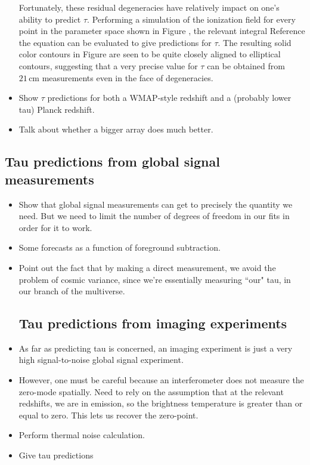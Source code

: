 \documentclass[twocolumn,aps,prd,nofootinbib,showpacs]{revtex4-1}
\begin{document}
\begin{itemize}
Fortunately, these residual degeneracies have relatively impact on one's ability to predict $\tau$. Performing a simulation of the ionization field for every point in the parameter space shown in Figure \label{fig:21cmDegen_wTau}, the relevant integral \acl{Reference the equation} can be evaluated to give predictions for $\tau$. The resulting solid color contours in Figure \label{fig:21cmDegen_wTau} are seen to be quite closely aligned to elliptical contours, suggesting that a very precise value for $\tau$ can be obtained from $21\,\textrm{cm}$ measurements even in the face of degeneracies.

\item Show $\tau$ predictions for both a WMAP-style redshift and a (probably lower tau) Planck redshift.
\item Talk about whether a bigger array does much better.
\end{itemize}
\subsection{Tau predictions from global signal measurements}
\begin{itemize}
\item Show that global signal measurements can get to precisely the quantity we need. But we need to limit the number of degrees of freedom in our fits in order for it to work.
\item Some forecasts as a function of foreground subtraction.
\item Point out the fact that by making a direct measurement, we avoid the problem of cosmic variance, since we're essentially measuring ``our" tau, in our branch of the multiverse.
\subsection{Tau predictions from imaging experiments}
\item As far as predicting tau is concerned, an imaging experiment is just a very high signal-to-noise global signal experiment.
\item However, one must be careful because an interferometer does not measure the zero-mode spatially. Need to rely on the assumption that at the relevant redshifts, we are in emission, so the brightness temperature is greater than or equal to zero. This lets us recover the zero-point.
\item Perform thermal noise calculation.
\item Give tau predictions
\end{itemize}
\end{document}
